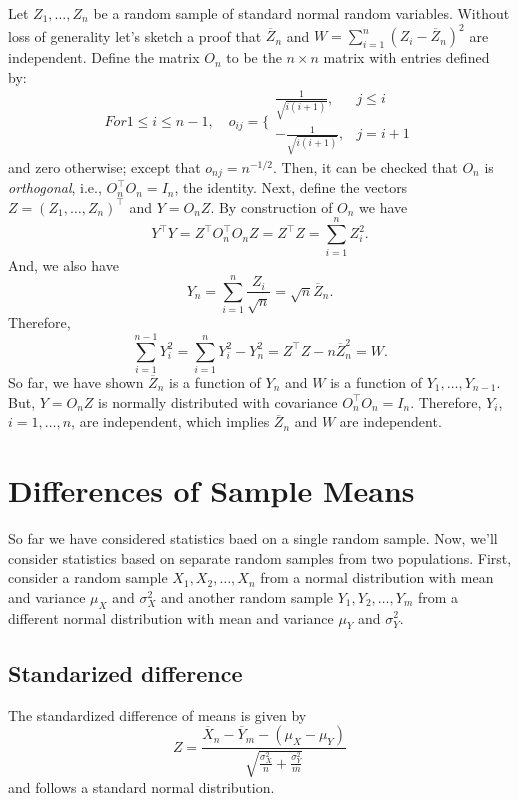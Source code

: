 \documentclass[
]{book}
\begin{document}
Let \(Z_1, \ldots, Z_n\) be a random sample of standard normal random variables. Without loss of generality let's sketch a proof that \(\overline Z_n\) and \(W = \sum_{i=1}^n (Z_i - \overline Z_n)^2\) are independent. Define the matrix \(O_n\) to be the \(n\times n\) matrix with entries defined by:
\[For 1 \leq i \leq n-1, \quad o_{ij} = \Bigg\{ \begin{matrix} \frac{1}{\sqrt{i(i+1)}}, &j\leq i \\
-\frac{1}{\sqrt{i(i+1)}}, &j= i+1 
\end{matrix}\]
and zero otherwise; except that \(o_{nj} = n^{-1/2}\). Then, it can be checked that \(O_n\) is \emph{orthogonal}, i.e., \(O_n^\top O_n = I_n\), the identity. Next, define the vectors \(Z = (Z_1, \ldots, Z_n)^\top\) and \(Y = O_n Z\). By construction of \(O_n\) we have
\[Y^\top Y = Z^\top O_n^\top O_n Z = Z^\top Z = \sum_{i=1}^n Z_i^2.\]
And, we also have
\[Y_n = \sum_{i=1}^n \frac{Z_i}{\sqrt{n}} = \sqrt{n} \overline Z_n.\]
Therefore,
\[\sum_{i=1}^{n-1}Y_i^2 = \sum_{i=1}^{n}Y_i^2 - Y_n^2 = Z^\top Z - n\overline Z_n^2 = W.\]
So far, we have shown \(\overline Z_n\) is a function of \(Y_n\) and \(W\) is a function of \(Y_1, \ldots, Y_{n-1}\). But, \(Y = O_n Z\) is normally distributed with covariance \(O_n^\top O_n = I_n\). Therefore, \(Y_i\), \(i=1, \ldots, n\), are independent, which implies \(\overline Z_n\) and \(W\) are independent.

\hypertarget{differences-of-sample-means}{%
\section{Differences of Sample Means}\label{differences-of-sample-means}}

So far we have considered statistics baed on a single random sample. Now, we'll consider statistics based on separate random samples from two populations. First, consider a random sample \(X_1, X_2, \ldots, X_{n}\) from a normal distribution with mean and variance \(\mu_X\) and \(\sigma_X^2\) and another random sample \(Y_1, Y_2, \ldots, Y_m\) from a different normal distribution with mean and variance \(\mu_Y\) and \(\sigma_Y^2\).

\hypertarget{standarized-difference}{%
\subsection{Standarized difference}\label{standarized-difference}}

The standardized difference of means is given by
\[Z = \frac{\overline X_n - \overline Y_m - (\mu_X - \mu_Y)}{\sqrt{\frac{\sigma_X^2}{n} + \frac{\sigma_Y^2}{m}}}\]
and follows a standard normal distribution.
\end{document}
